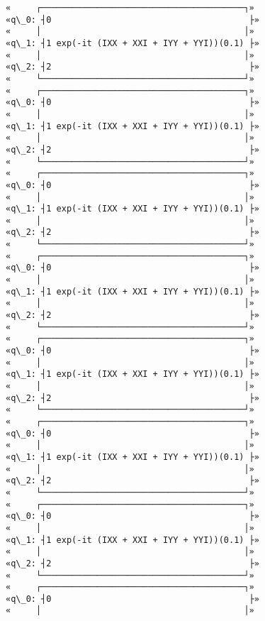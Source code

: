 \documentclass[11pt]{article}
\begin{document}
\begin{Verbatim}[commandchars=\\\{\}]
«     ┌────────────────────────────────────────┐»
«q\_0: ┤0                                       ├»
«     │                                        │»
«q\_1: ┤1 exp(-it (IXX + XXI + IYY + YYI))(0.1) ├»
«     │                                        │»
«q\_2: ┤2                                       ├»
«     └────────────────────────────────────────┘»
«     ┌────────────────────────────────────────┐»
«q\_0: ┤0                                       ├»
«     │                                        │»
«q\_1: ┤1 exp(-it (IXX + XXI + IYY + YYI))(0.1) ├»
«     │                                        │»
«q\_2: ┤2                                       ├»
«     └────────────────────────────────────────┘»
«     ┌────────────────────────────────────────┐»
«q\_0: ┤0                                       ├»
«     │                                        │»
«q\_1: ┤1 exp(-it (IXX + XXI + IYY + YYI))(0.1) ├»
«     │                                        │»
«q\_2: ┤2                                       ├»
«     └────────────────────────────────────────┘»
«     ┌────────────────────────────────────────┐»
«q\_0: ┤0                                       ├»
«     │                                        │»
«q\_1: ┤1 exp(-it (IXX + XXI + IYY + YYI))(0.1) ├»
«     │                                        │»
«q\_2: ┤2                                       ├»
«     └────────────────────────────────────────┘»
«     ┌────────────────────────────────────────┐»
«q\_0: ┤0                                       ├»
«     │                                        │»
«q\_1: ┤1 exp(-it (IXX + XXI + IYY + YYI))(0.1) ├»
«     │                                        │»
«q\_2: ┤2                                       ├»
«     └────────────────────────────────────────┘»
«     ┌────────────────────────────────────────┐»
«q\_0: ┤0                                       ├»
«     │                                        │»
«q\_1: ┤1 exp(-it (IXX + XXI + IYY + YYI))(0.1) ├»
«     │                                        │»
«q\_2: ┤2                                       ├»
«     └────────────────────────────────────────┘»
«     ┌────────────────────────────────────────┐»
«q\_0: ┤0                                       ├»
«     │                                        │»
«q\_1: ┤1 exp(-it (IXX + XXI + IYY + YYI))(0.1) ├»
«     │                                        │»
«q\_2: ┤2                                       ├»
«     └────────────────────────────────────────┘»
«     ┌────────────────────────────────────────┐»
«q\_0: ┤0                                       ├»
«     │                                        │»

\end{Verbatim}
\end{document}
